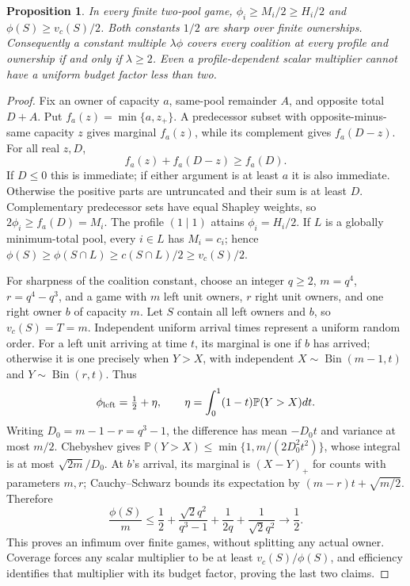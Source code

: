 \documentclass[11pt]{article}
\newtheorem{proposition}[theorem]{Proposition}
\theoremstyle{definition}\newtheorem{definition}[theorem]{Definition}
\theoremstyle{remark}\newtheorem{remark}[theorem]{Remark}
\newcommand{\Prob}{\mathbb P}
\begin{document}
\begin{proposition}\label{hist:shapley-half}
In every finite two-pool game,
$\phi_i\ge M_i/2\ge H_i/2$ and $\phi(S)\ge v_c(S)/2$.
Both constants $1/2$ are sharp over finite ownerships. Consequently a
constant multiple $\lambda\phi$ covers every coalition at every profile
and ownership if and only if $\lambda\ge2$. Even a profile-dependent
scalar multiplier cannot have a uniform budget factor less than two.
\end{proposition}
\begin{proof}
Fix an owner of capacity $a$, same-pool remainder $A$, and opposite total
$D+A$. Put $f_a(z)=\min\{a,z_+\}$. A predecessor subset with opposite-minus-
same capacity $z$ gives marginal $f_a(z)$, while its complement gives
$f_a(D-z)$. For all real $z,D$,
\[
 f_a(z)+f_a(D-z)\ge f_a(D).
\]
If $D\le0$ this is immediate; if either argument is at least $a$ it is
also immediate. Otherwise the positive parts are untruncated and their
sum is at least $D$. Complementary predecessor sets have equal Shapley
weights, so $2\phi_i\ge f_a(D)=M_i$. The profile $(1\mid1)$ attains
$\phi_i=H_i/2$. If $L$ is a globally minimum-total pool, every $i\in L$
has $M_i=c_i$; hence
$\phi(S)\ge\phi(S\cap L)\ge c(S\cap L)/2\ge v_c(S)/2$.

For sharpness of the coalition constant, choose an integer $q\ge2$,
$m=q^4$, $r=q^4-q^3$, and a game with $m$ left unit owners, $r$ right
unit owners, and one right owner $b$ of capacity $m$. Let $S$ contain all
left owners and $b$, so $v_c(S)=T=m$. Independent uniform arrival times
represent a uniform random order. For a left unit arriving at time $t$,
its marginal is one if $b$ has arrived; otherwise it is one precisely
when $Y>X$, with independent $X\sim\operatorname{Bin}(m-1,t)$ and
$Y\sim\operatorname{Bin}(r,t)$. Thus
\[
 \phi_{\rm left}=\tfrac12+\eta,
 \qquad \eta=\int_0^1(1-t)\Prob(Y>X)dt.
\]
Writing $D_0=m-1-r=q^3-1$, the difference has mean $-D_0t$ and variance
at most $m/2$. Chebyshev gives
$\Prob(Y>X)\le\min\{1,m/(2D_0^2t^2)\}$, whose integral is at most
$\sqrt{2m}/D_0$. At $b$'s arrival, its marginal is $(X-Y)_+$ for counts
with parameters $m,r$; Cauchy--Schwarz bounds its expectation by
$(m-r)t+\sqrt{m/2}$. Therefore
\[
 \frac{\phi(S)}m\le\frac12+
 \frac{\sqrt2q^2}{q^3-1}+\frac1{2q}+\frac1{\sqrt2q^2}\longrightarrow\frac12.
\]
This proves an infimum over finite games, without splitting any actual
owner. Coverage forces any scalar multiplier to be at least
$v_c(S)/\phi(S)$, and efficiency identifies that multiplier with its
budget factor, proving the last two claims.
\end{proof}
\end{document}
